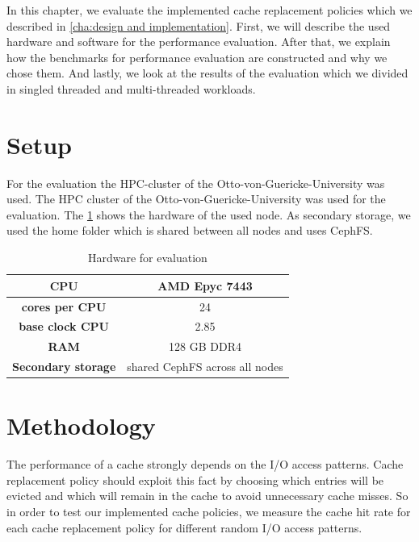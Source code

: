 \documentclass[
	12pt,
	a4paper,
	abstract,
	bibliography=totoc,
	chapterprefix,
	headings=openright,
	numbers=endperiod,
	parskip=half,
	twoside,
]{scrreprt}
\begin{document}

In this chapter, we evaluate the implemented cache replacement policies which we described in \cref{cha:design and implementation}.
First, we will describe the used hardware and software for the performance evaluation.
After that, we explain how the benchmarks for performance evaluation are constructed and why we chose them.
And lastly, we look at the results of the evaluation which we divided in singled threaded and multi-threaded workloads.

\section{Setup}



For the evaluation the HPC-cluster of the Otto-von-Guericke-University was used.
The HPC cluster of the Otto-von-Guericke-University was used for the evaluation.
The \cref{tab:hardware node} shows the hardware of the used node.
As secondary storage, we used the home folder which is shared between all nodes and uses CephFS.

\begin{table}[ht]
	\centering
	\begin{tabular}{|c|c|}
		\hline
		\textbf{CPU} & AMD Epyc 7443\\
		\hline
		\textbf{cores per CPU} & 24\\
		\hline
		\textbf{base clock CPU} & 2.85\\
		\hline
		\textbf{RAM} & 128 GB DDR4\\
		\hline
		\textbf{Secondary storage} & shared CephFS across all nodes \\
		\hline
	\end{tabular}
	\caption{Hardware for evaluation}
	\label{tab:hardware node}
\end{table}


\section{Methodology}

The performance of a cache strongly depends on the I/O access patterns.
Cache replacement policy should exploit this fact by 
choosing which entries will be evicted and which will remain in the cache 
to avoid unnecessary cache misses.
So in order to test our implemented cache policies,
we measure the cache hit rate for each cache replacement policy for different 
random I/O access patterns.
\end{document}
